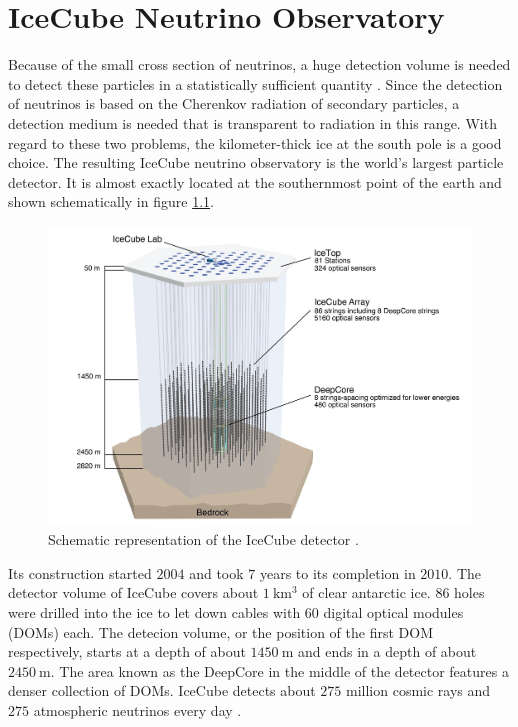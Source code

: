 \chapter{IceCube Neutrino Observatory} \label{sec:icecube}

Because of the small cross section of neutrinos, a huge detection volume is needed to detect these particles in a statistically sufficient quantity \cite{cross_n}.
Since the detection of neutrinos is based on the Cherenkov radiation of secondary particles, a detection medium is needed that is transparent to radiation in this range.
With regard to these two problems, the kilometer-thick ice at the south pole is a good choice.
The resulting IceCube neutrino observatory is the world's largest particle detector.
It is almost exactly located at the southernmost point of the earth and shown schematically in figure \ref{fig:icecube}.

\begin{figure}
    \centering
    \includegraphics[width=\linewidth]{Plots/01_7_icecube/IceCube-Array.jpg}
    \caption{Schematic representation of the IceCube detector \cite{icecube_website}.}
    \label{fig:icecube}
\end{figure}

Its construction started $\num{2004}$ and took $\num{7}$ years to its completion in $\num{2010}$.
The detector volume of IceCube covers about $\SI{1}{\kilo\meter\tothe{3}}$ of clear antarctic ice.
$\num{86}$ holes were drilled into the ice to let down cables with $\num{60}$ digital optical modules (DOMs) each.
The detecion volume, or the position of the first DOM respectively, starts at a depth of about $\SI{1450}{\meter}$ and ends in a depth of about $\SI{2450}{\meter}$.
The area known as the DeepCore in the middle of the detector features a denser collection of DOMs.
IceCube detects about $\num{275}$ million cosmic rays and $\num{275}$ atmospheric neutrinos every day \cite{icecube_website}.

